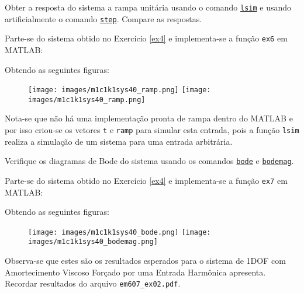 \documentclass{article}
\begin{document}
\newpage\begin{exercise}\label{ex6}
    Obter a resposta do sistema a rampa unitária usando o comando \href{https://www.mathworks.com/help/control/ref/lti.lsim.html}{\texttt{lsim}} e usando artificialmente o comando \href{https://www.mathworks.com/help/control/ref/lti.step.html}{\texttt{step}}. Compare as respostas.
\end{exercise}
\begin{resolution}
    Parte-se do sistema obtido no Exercício \ref{ex4} e implementa-se a função \texttt{ex6} em MATLAB:
    \begin{scriptsize}
        \myMatlab
    \end{scriptsize}
    Obtendo as seguintes figuras:
    \begin{figure}[H]
        \centering
        \texttt{[image: images/m1c1k1sys40\_ramp.png]}
        \texttt{[image: images/m1c1k1sys40\_ramp.png]}
    \end{figure}
    Nota-se que não há uma implementação pronta de rampa dentro do MATLAB e por isso criou-se os vetores \texttt{t} e \texttt{ramp} para simular esta entrada, pois a função \texttt{lsim} realiza a simulação de um sistema para uma entrada arbitrária.\\

\end{resolution}

\newpage\begin{exercise}\label{ex7}
    Verifique os diagramas de Bode do sistema usando os comandos \href{https://www.mathworks.com/help/control/ref/lti.bode.html}{\texttt{bode}} e \href{https://www.mathworks.com/help/ident/ref/lti.bodemag.html}{\texttt{bodemag}}.
\end{exercise}
\begin{resolution}
    Parte-se do sistema obtido no Exercício \ref{ex4} e implementa-se a função \texttt{ex7} em MATLAB:
    \begin{scriptsize}
        \myMatlab
    \end{scriptsize}
    Obtendo as seguintes figuras:
    \begin{figure}[H]
        \centering
        \texttt{[image: images/m1c1k1sys40\_bode.png]}
        \texttt{[image: images/m1c1k1sys40\_bodemag.png]}
    \end{figure}
    Observa-se que estes são os resultados esperados para o sistema de 1DOF com Amortecimento Viscoso Forçado por uma Entrada Harmônica apresenta. Recordar resultados do arquivo \texttt{em607\_ex02.pdf}.
\end{resolution}
\end{document}
